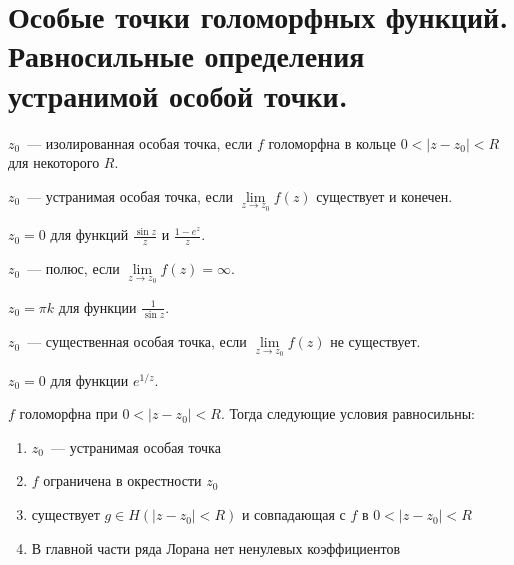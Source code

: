\section{Особые точки голоморфных функций. Равносильные определения устранимой особой точки.}

\begin{definition}
    $z_0$~--- изолированная особая точка,
    если $f$ голоморфна в кольце $0 < |z-z_0| < R$
    для некоторого $R$.
\end{definition}

\begin{definition}
    $z_0$~--- устранимая особая точка, если
    $\lim\limits_{z\to z_0} f(z)$ существует и конечен.
\end{definition}

\begin{example}
    $z_0 = 0$ для функций $\frac{\sin z}{z}$ и
    $\frac{1-e^z}{z}$.
\end{example}

\begin{definition}
    $z_0$~--- полюс, если
    $\lim\limits_{z\to z_0} f(z) = \infty$.
\end{definition}

\begin{example}
    $z_0 = \pi k$ для функции $\frac{1}{\sin z}$.
\end{example}

\begin{definition}
    $z_0$~--- существенная особая точка, если
    $\lim\limits_{z\to z_0} f(z)$ не существует.
\end{definition}

\begin{example}
    $z_0 = 0$ для функции $e^{1/z}$.
\end{example}

\begin{theorem}

    $f$ голоморфна при $0 < |z-z_0| < R$. Тогда
    следующие условия равносильны:

    \begin{enumerate}
        \item $z_0$~--- устранимая особая точка
        \item $f$ ограничена в окрестности $z_0$
        \item существует $g \in H(|z-z_0|<R)$ и совпадающая с
              $f$ в $0 < |z-z_0| < R$
        \item В главной части ряда Лорана нет ненулевых коэффициентов
    \end{enumerate}
\end{theorem}

